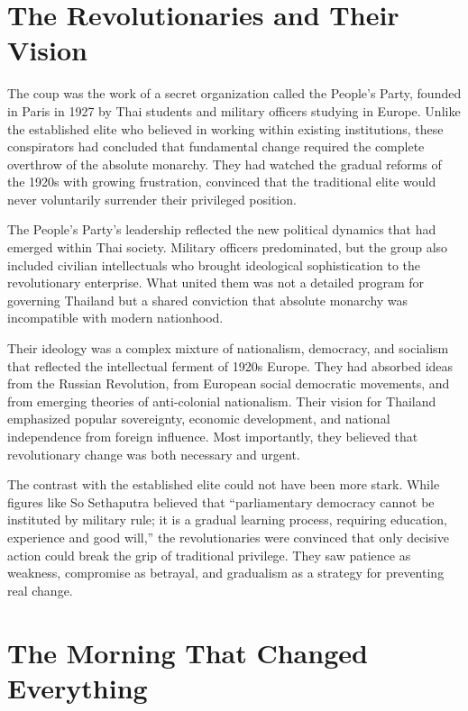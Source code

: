 \documentclass[
  Letterpaper,
]{scrbook}
\begin{document}
\section{The Revolutionaries and Their
Vision}\label{the-revolutionaries-and-their-vision}

The coup was the work of a secret organization called the People's
Party, founded in Paris in 1927 by Thai students and military officers
studying in Europe. Unlike the established elite who believed in working
within existing institutions, these conspirators had concluded that
fundamental change required the complete overthrow of the absolute
monarchy. They had watched the gradual reforms of the 1920s with growing
frustration, convinced that the traditional elite would never
voluntarily surrender their privileged position.

The People's Party's leadership reflected the new political dynamics
that had emerged within Thai society. Military officers predominated,
but the group also included civilian intellectuals who brought
ideological sophistication to the revolutionary enterprise. What united
them was not a detailed program for governing Thailand but a shared
conviction that absolute monarchy was incompatible with modern
nationhood.

Their ideology was a complex mixture of nationalism, democracy, and
socialism that reflected the intellectual ferment of 1920s Europe. They
had absorbed ideas from the Russian Revolution, from European social
democratic movements, and from emerging theories of anti-colonial
nationalism. Their vision for Thailand emphasized popular sovereignty,
economic development, and national independence from foreign influence.
Most importantly, they believed that revolutionary change was both
necessary and urgent.

The contrast with the established elite could not have been more stark.
While figures like So Sethaputra believed that ``parliamentary democracy
cannot be instituted by military rule; it is a gradual learning process,
requiring education, experience and good will,'' the revolutionaries
were convinced that only decisive action could break the grip of
traditional privilege. They saw patience as weakness, compromise as
betrayal, and gradualism as a strategy for preventing real change.

\section{The Morning That Changed
Everything}\label{the-morning-that-changed-everything}
\end{document}
